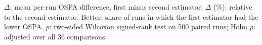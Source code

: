 \begin{table}[!htbp]
\smallskip
\parbox{\textwidth}{\footnotesize $\Delta$: mean per-run OSPA difference, first minus second estimator; $\Delta$ (\%): relative to the second estimator. Better: share of runs in which the first estimator had the lower OSPA. $p$: two-sided Wilcoxon signed-rank test on 500 paired runs; Holm $p$: adjusted over all 36 comparisons.}
\end{table}

